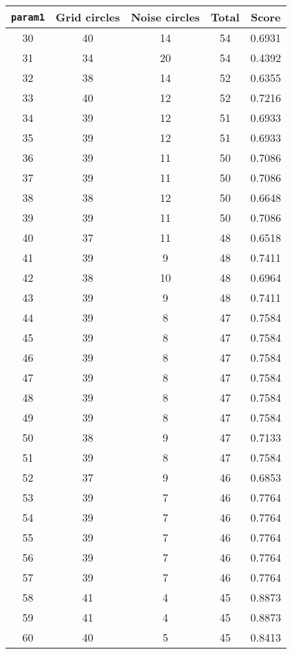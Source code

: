 \documentclass[letterpaper, 12pt]{article}
\begin{document}
\begin{longtable}{|c|c|c|c|c|}
\hline
\textbf{\texttt{param1}} & \textbf{Grid circles} & \textbf{Noise circles} & \textbf{Total} & \textbf{Score} \\
\hline
30 & 40 & 14 & 54 & 0.6931 \\
\hline
31 & 34 & 20 & 54 & 0.4392 \\
\hline
32 & 38 & 14 & 52 & 0.6355 \\
\hline
33 & 40 & 12 & 52 & 0.7216 \\
\hline
34 & 39 & 12 & 51 & 0.6933 \\
\hline
35 & 39 & 12 & 51 & 0.6933 \\
\hline
36 & 39 & 11 & 50 & 0.7086 \\
\hline
37 & 39 & 11 & 50 & 0.7086 \\
\hline
38 & 38 & 12 & 50 & 0.6648 \\
\hline
39 & 39 & 11 & 50 & 0.7086 \\
\hline
40 & 37 & 11 & 48 & 0.6518 \\
\hline
41 & 39 & 9 & 48 & 0.7411 \\
\hline
42 & 38 & 10 & 48 & 0.6964 \\
\hline
43 & 39 & 9 & 48 & 0.7411 \\
\hline
44 & 39 & 8 & 47 & 0.7584 \\
\hline
45 & 39 & 8 & 47 & 0.7584 \\
\hline
46 & 39 & 8 & 47 & 0.7584 \\
\hline
47 & 39 & 8 & 47 & 0.7584 \\
\hline
48 & 39 & 8 & 47 & 0.7584 \\
\hline
49 & 39 & 8 & 47 & 0.7584 \\
\hline
50 & 38 & 9 & 47 & 0.7133 \\
\hline
51 & 39 & 8 & 47 & 0.7584 \\
\hline
52 & 37 & 9 & 46 & 0.6853 \\
\hline
53 & 39 & 7 & 46 & 0.7764 \\
\hline
54 & 39 & 7 & 46 & 0.7764 \\
\hline
55 & 39 & 7 & 46 & 0.7764 \\
\hline
56 & 39 & 7 & 46 & 0.7764 \\
\hline
57 & 39 & 7 & 46 & 0.7764 \\
\hline
58 & 41 & 4 & 45 & 0.8873 \\
\hline
59 & 41 & 4 & 45 & 0.8873 \\
\hline
60 & 40 & 5 & 45 & 0.8413 \\
\hline

\end{longtable}
\end{document}
